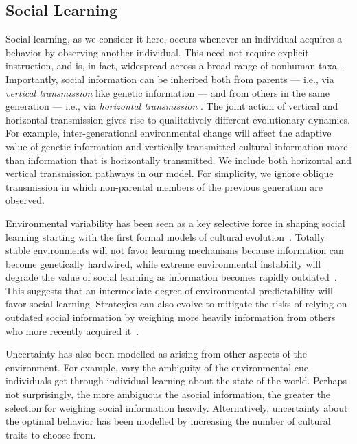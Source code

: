 \documentclass[letterpaper,11.5pt]{scrartcl}
\begin{document}
\subsection{Social Learning}

Social learning, as we consider it here, occurs whenever an individual acquires a behavior by observing another individual. This need not require explicit instruction, and is, in fact, widespread across a broad range of nonhuman 
taxa~\cite{Kendal2018,Allen2019}. Importantly, social information can be inherited both
from parents --- i.e., via \emph{vertical transmission} like genetic information --- and
from others in the same generation --- i.e., via \emph{horizontal transmission}
\cite{CavalliFeldman1981}. The joint action of vertical and horizontal transmission
gives rise to qualitatively different evolutionary dynamics. For example,
inter-generational environmental change will affect the adaptive value of genetic
information and vertically-transmitted cultural information more than information
that is horizontally transmitted. We include both horizontal and vertical transmission pathways in our
model. For simplicity, we ignore oblique transmission in which non-parental members
of the previous generation are observed.

Environmental variability has been seen as a key selective force in shaping social learning starting with the first formal models of cultural evolution~\cite{CavalliFeldman1981,BoydRicherson1985}.
Totally stable environments will not favor learning mechanisms because information can become genetically hardwired, while  extreme environmental instability will degrade the value
of social learning as information becomes rapidly outdated~\cite{Feldman1996}. This suggests that an intermediate degree of environmental predictability will favor social learning. Strategies can also evolve to mitigate the risks of relying on outdated social information by weighing more heavily information from others who more recently acquired it~\cite{Rendell2010}.

Uncertainty has also been modelled as arising from other aspects of the environment. 
For example,  vary the ambiguity of the environmental cue individuals get through individual learning about the state of the world. Perhaps not surprisingly, the more ambiguous the asocial information, the greater the selection for weighing social information heavily. Alternatively, uncertainty about the optimal behavior has been modelled by increasing the number of cultural traits to choose from. 
\end{document}
